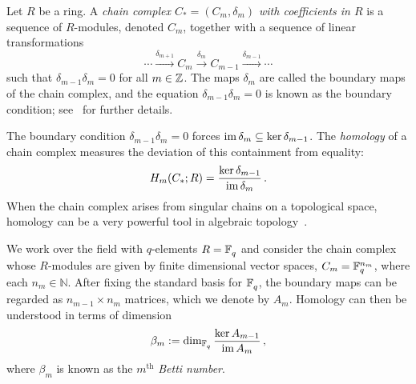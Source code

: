 Let $R$ be a ring. A {\em chain complex $C_*=(C_m, \delta_m)$ with coefficients in
$R$} is a sequence of $R$-modules, denoted $C_m$, together with a sequence of
linear transformations 
\[
  \cdots \xrightarrow{\delta_{m+1}} C_m \xrightarrow{\delta_m}
  C_{m-1} \xrightarrow{\delta_{m-1}} \cdots
\]
such that $\delta_{m-1}\delta_m = 0$ for all $m \in \mathbb{Z}$.  The maps $\delta_m$
are called the boundary maps of the chain complex, and the equation
$\delta_{m-1} \delta_m = 0$ is known as the boundary condition;
see~\cite{cartan2016homological} for further details. 

The boundary condition $\delta_{m-1}\delta_m=0$ forces $\operatorname{\mathrm{im}} \delta_m \subseteq \ker \delta_{m-1}$.
The {\em homology} of a chain complex measures the deviation of this containment
from equality:
\begin{equation*}
  \label{eqn:hom}
  H_m(C_*;R) = \frac{\ker \delta_{m-1}}{\operatorname{\mathrm{im}} \delta_m} \, .
\end{equation*}
When the chain complex arises from singular chains on a topological
space, homology can be a very powerful tool in algebraic topology~\cite{hatcher2002algebraic}. 

We work over the field with $q$-elements $R = \mathbb{F}_q^{}$ and consider the chain
complex whose $R$-modules are given by finite dimensional vector spaces,  $C_m
= \mathbb{F}_q^{n_m}$, where each $n_m \in \mathbb{N}$. After fixing the standard
basis for $\mathbb{F}_q^{}$, the boundary
maps can be regarded as $n_{m-1}\times n_m $ matrices, which we denote by
$A_m$. Homology can then be understood in terms of dimension
\begin{equation*}
  \beta_m := \dim_{\mathbb{F}_q^{}} \frac{\ker A_{m-1}}{\operatorname{\mathrm{im}} A_m} \, ,
  \label{eqn:betti_numbers}
\end{equation*}
where $\beta_m$ is known as the $m^\mathrm{th}$ {\em Betti number}.

%

